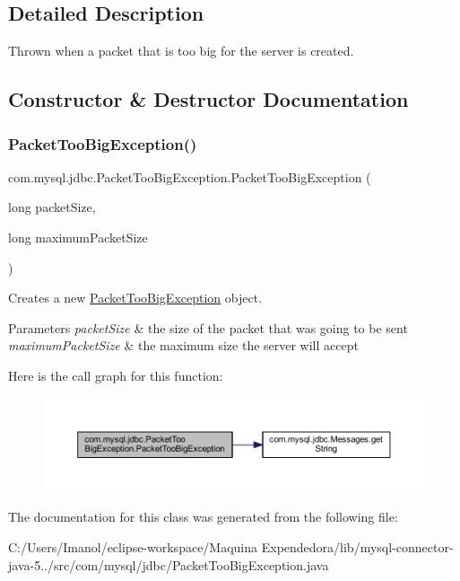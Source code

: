 \subsection{Detailed Description}
Thrown when a packet that is too big for the server is created. 

\subsection{Constructor \& Destructor Documentation}
\mbox{\label{classcom_1_1mysql_1_1jdbc_1_1_packet_too_big_exception_a8a7ea4d7d32d6f99f7ded58af204d5f1}} 
\subsubsection{\texorpdfstring{Packet\+Too\+Big\+Exception()}{PacketTooBigException()}}
{\footnotesize\ttfamily com.\+mysql.\+jdbc.\+Packet\+Too\+Big\+Exception.\+Packet\+Too\+Big\+Exception (\begin{DoxyParamCaption}\item[{long}]{packet\+Size,  }\item[{long}]{maximum\+Packet\+Size }\end{DoxyParamCaption})}

Creates a new \mbox{\hyperlink{classcom_1_1mysql_1_1jdbc_1_1_packet_too_big_exception}{Packet\+Too\+Big\+Exception}} object.


\begin{DoxyParams}{Parameters}
{\em packet\+Size} & the size of the packet that was going to be sent \\
\hline
{\em maximum\+Packet\+Size} & the maximum size the server will accept \\
\hline
\end{DoxyParams}
Here is the call graph for this function\+:
\nopagebreak
\begin{figure}[H]
\begin{center}
\leavevmode
\includegraphics[width=350pt]{classcom_1_1mysql_1_1jdbc_1_1_packet_too_big_exception_a8a7ea4d7d32d6f99f7ded58af204d5f1_cgraph}
\end{center}
\end{figure}


The documentation for this class was generated from the following file\+:\begin{DoxyCompactItemize}
\item 
C\+:/\+Users/\+Imanol/eclipse-\/workspace/\+Maquina Expendedora/lib/mysql-\/connector-\/java-\/5../src/com/mysql/jdbc/Packet\+Too\+Big\+Exception.\+java\end{DoxyCompactItemize}
